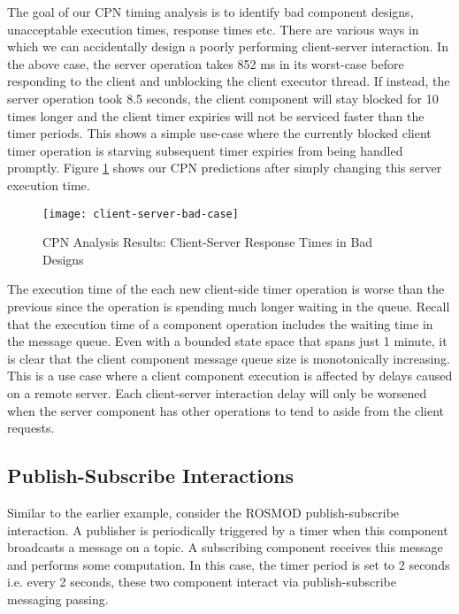 The goal of our CPN timing analysis is to identify bad component designs, unacceptable execution times, response times etc. There are various ways in which we can accidentally design a poorly performing client-server interaction. In the above case, the server operation takes 852 ms in its worst-case before responding to the client and unblocking the client executor thread. If instead, the server operation took 8.5 seconds, the client component will stay blocked for 10 times longer and the client timer expiries will not be serviced faster than the timer periods. This shows a simple use-case where the currently blocked client timer operation is starving subsequent timer expiries from being handled promptly. Figure \ref{fig:client-server-bad-case} shows our CPN predictions after simply changing this server execution time. 

\begin{figure}[h]
	\centering
	\texttt{[image: client-server-bad-case]}
	\caption{CPN Analysis Results: Client-Server Response Times in Bad Designs}
	\label{fig:client-server-bad-case}
\end{figure}
\FloatBarrier

The execution time of the each new client-side timer operation is worse than the previous since the operation is spending much longer waiting in the queue. Recall that the execution time of a component operation includes the waiting time in the message queue. Even with a bounded state space that spans just 1 minute, it is clear that the client component message queue size is monotonically increasing. This is a use case where a client component execution is affected by delays caused on a remote server. Each client-server interaction delay will only be worsened when the server component has other operations to tend to aside from the client requests. 

\subsection{Publish-Subscribe Interactions}

Similar to the earlier example, consider the ROSMOD publish-subscribe interaction. A publisher is periodically triggered by a timer when this component broadcasts a message on a topic. A subscribing component receives this message and performs some computation. In this case, the timer period is set to 2 seconds i.e. every 2 seconds, these two component interact via publish-subscribe messaging passing. 

